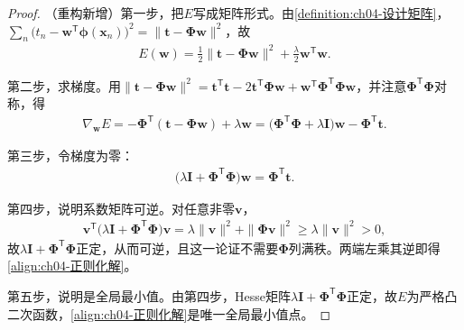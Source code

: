 \documentclass[../../main.tex]{subfiles}
\begin{document}
\begin{proof}
（重构新增）第一步，把$E$写成矩阵形式。由\cref{definition:ch04-设计矩阵}，$\sum_n\bigl(t_n-\boldsymbol{w}^{\mathsf{T}}\boldsymbol{\phi}(\boldsymbol{x}_n)\bigr)^2=\|\boldsymbol{t}-\boldsymbol{\Phi}\boldsymbol{w}\|^2$，故
\begin{align*}
  E(\boldsymbol{w})=\frac{1}{2}\|\boldsymbol{t}-\boldsymbol{\Phi}\boldsymbol{w}\|^2+\frac{\lambda}{2}\boldsymbol{w}^{\mathsf{T}}\boldsymbol{w}.
\end{align*}

第二步，求梯度。用$\|\boldsymbol{t}-\boldsymbol{\Phi}\boldsymbol{w}\|^2=\boldsymbol{t}^{\mathsf{T}}\boldsymbol{t}-2\boldsymbol{t}^{\mathsf{T}}\boldsymbol{\Phi}\boldsymbol{w}+\boldsymbol{w}^{\mathsf{T}}\boldsymbol{\Phi}^{\mathsf{T}}\boldsymbol{\Phi}\boldsymbol{w}$，并注意$\boldsymbol{\Phi}^{\mathsf{T}}\boldsymbol{\Phi}$对称，得
\begin{align*}
  \nabla_{\boldsymbol{w}}E=-\boldsymbol{\Phi}^{\mathsf{T}}(\boldsymbol{t}-\boldsymbol{\Phi}\boldsymbol{w})+\lambda\boldsymbol{w}
  =\bigl(\boldsymbol{\Phi}^{\mathsf{T}}\boldsymbol{\Phi}+\lambda\boldsymbol{I}\bigr)\boldsymbol{w}-\boldsymbol{\Phi}^{\mathsf{T}}\boldsymbol{t}.
\end{align*}

第三步，令梯度为零：
\begin{align*}
  \bigl(\lambda\boldsymbol{I}+\boldsymbol{\Phi}^{\mathsf{T}}\boldsymbol{\Phi}\bigr)\boldsymbol{w}=\boldsymbol{\Phi}^{\mathsf{T}}\boldsymbol{t}.
\end{align*}

第四步，说明系数矩阵可逆。对任意非零$\boldsymbol{v}$，
\begin{align*}
  \boldsymbol{v}^{\mathsf{T}}\bigl(\lambda\boldsymbol{I}+\boldsymbol{\Phi}^{\mathsf{T}}\boldsymbol{\Phi}\bigr)\boldsymbol{v}
  =\lambda\|\boldsymbol{v}\|^2+\|\boldsymbol{\Phi}\boldsymbol{v}\|^2\geqslant\lambda\|\boldsymbol{v}\|^2>0,
\end{align*}
故$\lambda\boldsymbol{I}+\boldsymbol{\Phi}^{\mathsf{T}}\boldsymbol{\Phi}$正定，从而可逆，且这一论证不需要$\boldsymbol{\Phi}$列满秩。两端左乘其逆即得\eqref{align:ch04-正则化解}。

第五步，说明是全局最小值。由第四步，Hesse矩阵$\lambda\boldsymbol{I}+\boldsymbol{\Phi}^{\mathsf{T}}\boldsymbol{\Phi}$正定，故$E$为严格凸二次函数，\eqref{align:ch04-正则化解}是唯一全局最小值点。
\end{proof}
\end{document}
